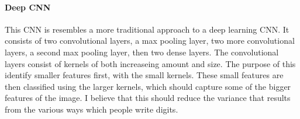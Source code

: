 \documentclass[11pt]{article}
\begin{document}
    \hypertarget{deep-cnn}{%
\paragraph{Deep CNN}\label{deep-cnn}}

This CNN is resembles a more traditional approach to a deep learning
CNN. It consists of two convolutional layers, a max pooling layer, two
more convolutional layers, a second max pooling layer, then two dense
layers. The convolutional layers consist of kernels of both increaseing
amount and size. The purpose of this identify smaller features first,
with the small kernels. These small features are then classified using
the larger kernels, which should capture some of the bigger features of
the image. I believe that this should reduce the variance that results
from the various ways which people write digits.
\end{document}
